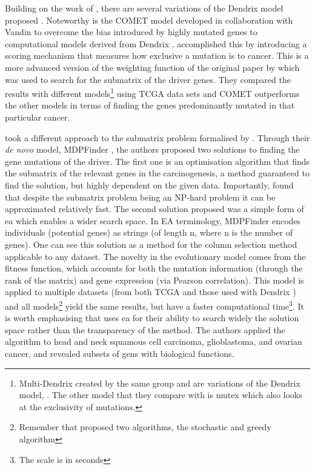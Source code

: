 Building on the work of \citeauthor{Vandin2012-cf}, there are several variations of the Dendrix model proposed \citep{Leiserson2013-da,Szczurek2014-dh,Leiserson2015-yk}. Noteworthy is the COMET \citep{Leiserson2015-yk} model developed in collaboration with Vandin to overcome the bias introduced by highly mutated genes to computational models derived from Dendrix \citep{Vandin2012-ns}. \cite{Leiserson2015-yk} accomplished this by introducing a scoring mechanism that measures how exclusive a mutation is to cancer. This is a more advanced version of the weighting function of the original paper by \citet{Vandin2012-cf} which was used to search for the submatrix of the driver genes. They compared the results with different models\footnote{Multi-Dendrix \citep{Leiserson2013-da} created by the same group and are variations of the Dendrix model, \citet{Vandin2012-cf}. The other model that they compare with is mutex \citep{Babur2015-qk} which also looks at the exclusivity of mutations.} using TCGA data sets and COMET outperforms the other models \citep{Leiserson2013-da,Szczurek2014-dh} in terms of finding the genes predominantly mutated in that particular cancer.

\citet{Zhao2012-wj} took a different approach to the submatrix problem formalised by \citet{Vandin2012-cf}. Through their \textit{de novo} model, MDPFinder \citep{Zhao2012-wj}, the authors proposed two solutions to finding the gene mutations of the driver. The first one is an optimisation algorithm that finds the submatrix of the relevant genes in the carcinogenesis, a method guaranteed to find the solution, but highly dependent on the given data. Importantly, \citet{Zhao2012-wj} found that despite the submatrix problem being an NP-hard problem \citep{Vandin2012-cf} it can be approximated relatively fast. The second solution proposed was a simple form of \acrlong{ea} which enables a wider search space. In EA terminology, MDPFinder encodes individuals (potential genes) as strings (of length n, where n is the number of genes). One can see this solution as a method for the column selection method applicable to any dataset. The novelty in the evolutionary model comes from the fitness function, which accounts for both the mutation information (through the rank of the matrix) and gene expression (via Pearson correlation). This model is applied to multiple datasets (from both TCGA and those used with Dendrix \citet{Vandin2012-cf}) and all models\footnote{Remember that \citet{Vandin2012-cf} proposed two algorithms, the stochastic and greedy algorithm} yield the same results, but \citet{Zhao2012-wj} have a faster computational time\footnote{The scale is in seconds}. It is worth emphasising that \citet{Zhao2012-wj} uses \acrshort{ea} for their ability to search widely the solution space rather than the transparency of the method. The authors applied the algorithm to head and neck squamous cell carcinoma, glioblastoma, and ovarian cancer, and revealed subsets of gens with biological functions.

